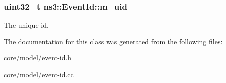 \subsubsection[{\texorpdfstring{m\+\_\+uid}{m_uid}}]{\setlength{\rightskip}{0pt plus 5cm}uint32\+\_\+t ns3\+::\+Event\+Id\+::m\+\_\+uid\hspace{0.3cm}{\ttfamily [private]}}\hypertarget{classns3_1_1EventId_a727974e1212742906af68bca5301db5c}{}\label{classns3_1_1EventId_a727974e1212742906af68bca5301db5c}
The unique id. 

The documentation for this class was generated from the following files\+:\begin{DoxyCompactItemize}
\item 
core/model/\hyperlink{event-id_8h}{event-\/id.\+h}\item 
core/model/\hyperlink{event-id_8cc}{event-\/id.\+cc}\end{DoxyCompactItemize}
